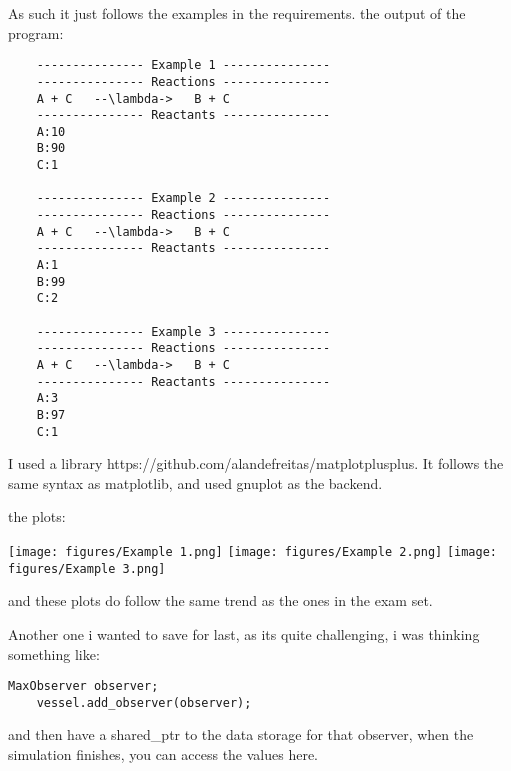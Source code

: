 As such it just follows the examples in the requirements. the output of the program:

\begin{lstlisting}
    --------------- Example 1 ---------------
    --------------- Reactions ---------------
    A + C   --\lambda->   B + C
    --------------- Reactants ---------------
    A:10
    B:90
    C:1
    
    --------------- Example 2 ---------------
    --------------- Reactions ---------------
    A + C   --\lambda->   B + C
    --------------- Reactants ---------------
    A:1
    B:99
    C:2
    
    --------------- Example 3 ---------------
    --------------- Reactions ---------------
    A + C   --\lambda->   B + C
    --------------- Reactants ---------------
    A:3
    B:97
    C:1
\end{lstlisting}


I used a library https://github.com/alandefreitas/matplotplusplus. It follows the same syntax as matplotlib, and used gnuplot as the backend.

the plots:

\texttt{[image: figures/Example 1.png]}
\texttt{[image: figures/Example 2.png]}
\texttt{[image: figures/Example 3.png]}

and these plots do follow the same trend as the ones in the exam set.


Another one i wanted to save for last, as its quite challenging, i was thinking something like:

\begin{lstlisting}[style=colorC++]
    MaxObserver observer;
    vessel.add_observer(observer);
\end{lstlisting}

and then have a shared\_ptr to the data storage for that observer, when the simulation finishes, you can access the values here.

